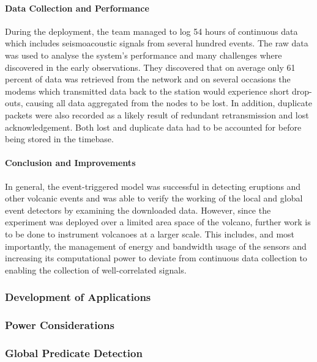 \paragraph{Data Collection and Performance}

During the deployment, the team managed to log 54 hours of continuous data which includes seismoacoustic signals from several hundred events. The raw data was used to analyse the system's performance and many challenges where discovered in the early observations. They discovered that on average only 61 percent of data was retrieved from the network and on several occasions the modems which transmitted data back to the station would experience short drop-outs, causing all data aggregated from the nodes to be lost. In addition, duplicate packets were also recorded as a likely result of redundant retransmission and lost acknowledgement. Both lost and duplicate data had to be accounted for before being stored in the timebase.

\paragraph{Conclusion and Improvements}

In general, the event-triggered model was successful in detecting eruptions and other volcanic events and was able to verify the working of the local and global event detectors by examining the downloaded data. However, since the experiment was deployed over a limited area space of the volcano, further work is to be done to instrument volcanoes at a larger scale. This includes, and most importantly, the management of energy and bandwidth usage of the sensors and increasing its computational power to deviate from continuous data collection to enabling the collection of well-correlated signals. 

\subsubsection*{Development of Applications}
\cite{Fagerstrom:1988:DTD:55823.55833}


\subsubsection*{Power Considerations}


\subsubsection*{Global Predicate Detection}

